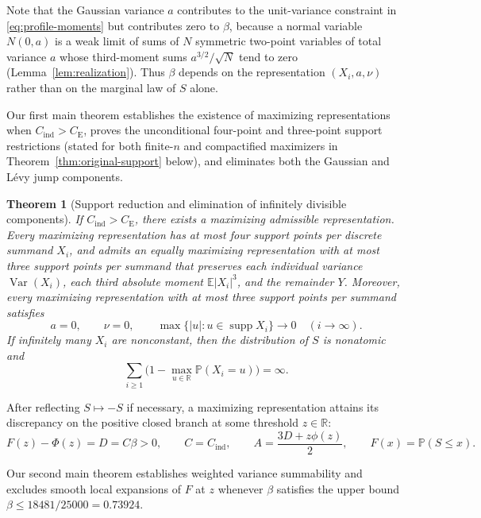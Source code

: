 \documentclass[11pt]{article}
\numberwithin{equation}{section}
\newtheorem{theorem}{Theorem}[section]
\theoremstyle{definition}
\DeclareMathOperator{\Var}{Var}
\DeclareMathOperator{\supp}{supp}
\newcommand{\E}{\mathbb E}
\newcommand{\Pp}{\mathbb P}
\newcommand{\R}{\mathbb R}
\newcommand{\ce}{C_{\mathrm E}}
\newcommand{\ci}{C_{\mathrm{ind}}}
\begin{document}
Note that the Gaussian variance $a$ contributes to the unit-variance
constraint in \eqref{eq:profile-moments} but contributes zero to $\beta$,
because a normal variable $N(0,a)$ is a weak limit of sums of $N$ symmetric
two-point variables of total variance $a$ whose third-moment sums
$a^{3/2}/\sqrt N$ tend to zero (Lemma~\ref{lem:realization}). Thus $\beta$
depends on the representation $(X_i,a,\nu)$ rather than on the marginal law
of $S$ alone.

Our first main theorem establishes the existence of maximizing
representations when $\ci>\ce$, proves the unconditional four-point and
three-point support restrictions (stated for both finite-$n$ and compactified
maximizers in Theorem~\ref{thm:original-support} below), and eliminates both
the Gaussian and L\'evy jump components.

\begin{theorem}[Support reduction and elimination of infinitely divisible components]\label{thm:structure}
If $\ci>\ce$, there exists a maximizing admissible representation. Every
maximizing representation has at most four support points per discrete
summand $X_i$, and admits an equally maximizing representation with at most
three support points per summand that preserves each individual variance
$\Var(X_i)$, each third absolute moment $\E|X_i|^3$, and the remainder $Y$.
Moreover, every maximizing representation with at most three support points
per summand satisfies
\begin{equation}\label{eq:main-structure}
 a=0,\qquad \nu=0,\qquad
 \max\{|u|:u\in\supp X_i\}\longrightarrow0\quad(i\to\infty).
\end{equation}
If infinitely many $X_i$ are nonconstant, then the distribution of $S$ is
nonatomic and
\[
 \sum_{i\ge1}\bigl(1-\max_{u\in\R}\Pp(X_i=u)\bigr)=\infty.
\]
\end{theorem}

After reflecting $S\mapsto-S$ if necessary, a maximizing representation
attains its discrepancy on the positive closed branch at some threshold
$z\in\R$:
\begin{equation}\label{eq:max-data}
 F(z)-\Phi(z)=D=C\beta>0,
 \qquad C=\ci,\qquad A=\frac{3D+z\phi(z)}2,
 \qquad F(x)=\Pp(S\le x).
\end{equation}

Our second main theorem establishes weighted variance summability and
excludes smooth local expansions of $F$ at $z$ whenever $\beta$ satisfies
the upper bound $\beta\le18481/25000=0.73924$.
\end{document}
